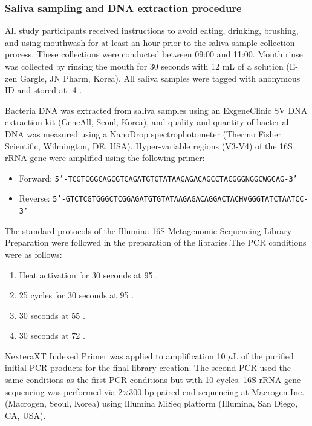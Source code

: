 \documentclass[11pt, a4paper, onecolumn, oneside]{report}
\begin{document}
            \subsubsection{Saliva sampling and DNA extraction procedure}
                All study participants received instructions to avoid eating, drinking, brushing, and using mouthwash for at least an hour prior to the saliva sample collection process. These collections were conducted between 09:00 and 11:00. Mouth rinse was collected by rinsing the mouth for 30 seconds with 12 mL of a solution (E-zen Gargle, JN Pharm, Korea). All saliva samples were tagged with anonymous ID and stored at -4 \textcelsius.

                Bacteria DNA was extracted from saliva samples using an Exgene\texttrademark Clinic SV DNA extraction kit (GeneAll, Seoul, Korea), and quality and quantity of bacterial DNA was measured using a NanoDrop spectrophotometer (Thermo Fisher Scientific, Wilmington, DE, USA). Hyper-variable regions (V3-V4) of the 16S rRNA gene were amplified using the following primer:
                \begin{itemize}
                    \item Forward: \texttt{5'-TCGTCGGCAGCGTCAGATGTGTATAAGAGACAGCCTACGGGNGGCWGCAG-3'}
                    \item Reverse: \texttt{5'-GTCTCGTGGGCTCGGAGATGTGTATAAGAGACAGGACTACHVGGGTATCTAATCC-3'}
                \end{itemize}

                The standard protocols of the Illumina 16S Metagenomic Sequencing Library Preparation were followed in the preparation of the libraries.The PCR conditions were as follows:
                \begin{enumerate}
                    \item Heat activation for 30 seconds at 95 \textcelsius.
                    \item 25 cycles for 30 seconds at 95 \textcelsius.
                    \item 30 seconds at 55 \textcelsius.
                    \item 30 seconds at 72 \textcelsius.
                \end{enumerate}

                NexteraXT Indexed Primer was applied to amplification 10 $\mu$L of the purified initial PCR products for the final library creation. The second PCR used the same conditions as the first PCR conditions but with 10 cycles. 16S rRNA gene sequencing was performed via 2$\times$300 bp paired-end sequencing at Macrogen Inc. (Macrogen, Seoul, Korea) using Illumina MiSeq platform (Illumina, San Diego, CA, USA).
\end{document}
